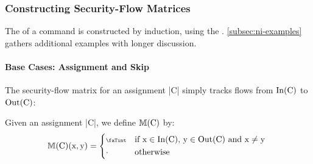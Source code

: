 \subsubsection{Constructing Security-Flow Matrices}%
\label{subsec:construction}

The  of a command is constructed by induction, using
the . \autoref{subsec:ni-examples} gathers additional
examples with longer discussion.

\paragraph{Base Cases: Assignment and Skip} The security-flow matrix for an
assignment \prc|C| simply tracks flows from $\In(\prc|C|)$
to $\Out(\prc|C|)$:

\begin{definition}[Assignment]%
\label{def:assignment}
Given an assignment \prc|C|, we define \(\sfm{\prc|C|}\)
by:
\[
\sfm{\prc|C|}(\prc|x|,\prc|y|)=
\begin{dcases*}
\vi & if $\prc|x| \in \In(\prc|C|)$,
$\prc|y| \in \Out(\prc|C|)$ and $\prc|x| \neq \prc|y|$ \\
\nv & otherwise
\end{dcases*}
\]
\end{definition}

